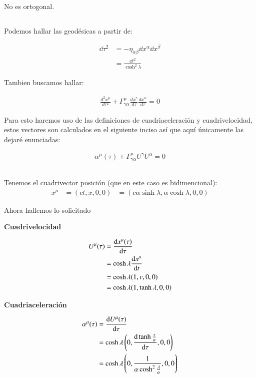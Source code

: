 No es ortogonal.

\subsection{}
Podemos hallar las geodésicas a partir de:

\begin{align*}
    \dd \tau^2 &= -\eta_{\alpha\beta}\dd x^\alpha\dd x^\beta\\
    &=\frac{\dd t^2}{\cosh^2\lambda}
\end{align*}

Tambien buscamos hallar:

\begin{align*}
    {\frac  {d^{2}x^{\mu}}{d\tau^{2}}}+\Gamma _{{\gamma\alpha}}^{{\mu}}{\frac  {dx^{\gamma}}{d\tau}}{\frac  {dx^{\alpha}}{d\tau}}=0
\end{align*}

Para esto haremos uso de las definiciones de cuadriaceleración y cuadrivelocidad, estos vectores son calculados en el siguiente inciso así que aquí únicamente las dejaré enunciadas:

\begin{align*}
    \alpha^\mu(\tau)+\Gamma_{\gamma\alpha}^\mu U^\gamma U^\alpha = 0
\end{align*}

\subsection{}

Tenemos el cuadrivector posición (que en este caso es bidimencional):
\begin{align*}
    x^\mu&=(ct,x,0,0)
    &=(c\alpha\sinh\lambda,\alpha\cosh\lambda,0,0)
\end{align*}

Ahora hallemos lo solicitado

\textbf{Cuadrivelocidad}

\begin{align*}
    U^\mu(\tau)&=\dv{x^\mu(\tau)}{\tau}\\
    &=\cosh\lambda\dv{x^\mu}{t}\\
    &=\cosh\lambda(1,v,0,0)\\
    &=\cosh\lambda(1,\tanh\lambda,0,0)
\end{align*}

\textbf{Cuadriaceleración}

\begin{align*}
    \alpha^\mu(\tau)&=\dv{U^\mu(\tau)}{\tau}\\
    &=\cosh\lambda\left(0,\dv{\tanh\frac{\tau}{\alpha}}{\tau},0,0\right)\\
    &=\cosh\lambda\left(0,\frac{1}{\alpha\cosh^2\frac{\lambda}{\alpha}},0,0\right)
\end{align*}

